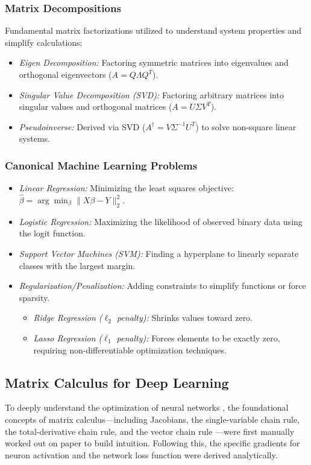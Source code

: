 \documentclass[conference]{IEEEtran}
\begin{document}
\subsubsection{Matrix Decompositions}
Fundamental matrix factorizations utilized to understand system properties and simplify calculations:
\begin{itemize}
    \item \textit{Eigen Decomposition:} Factoring symmetric matrices into eigenvalues and orthogonal eigenvectors ($A = Q\Lambda Q^T$).
    \item \textit{Singular Value Decomposition (SVD):} Factoring arbitrary matrices into singular values and orthogonal matrices ($A = U\Sigma V^T$).
    \item \textit{Pseudoinverse:} Derived via SVD ($A^\dagger = V\Sigma^{-1}U^T$) to solve non-square linear systems.
\end{itemize}

\subsubsection{Canonical Machine Learning Problems}
\begin{itemize}
    \item \textit{Linear Regression:} Minimizing the least squares objective: $\hat{\beta} = \arg\min_\beta \|X\beta - Y\|_2^2$.
    \item \textit{Logistic Regression:} Maximizing the likelihood of observed binary data using the logit function.
    \item \textit{Support Vector Machines (SVM):} Finding a hyperplane to linearly separate classes with the largest margin.
    \item \textit{Regularization/Penalization:} Adding constraints to simplify functions or force sparsity.
    \begin{itemize}
        \item[$\bullet$] \textit{Ridge Regression ($\ell_2$ penalty):} Shrinks values toward zero.
        \item[$\bullet$] \textit{Lasso Regression ($\ell_1$ penalty):} Forces elements to be exactly zero, requiring non-differentiable optimization techniques.
    \end{itemize}
\end{itemize}

\subsection{Matrix Calculus for Deep Learning}
To deeply understand the optimization of neural networks \cite{goodfellow2016deep}, the foundational concepts of matrix calculus—including Jacobians, the single-variable chain rule, the total-derivative chain rule, and the vector chain rule \cite{parr2018matrix}—were first manually worked out on paper to build intuition. Following this, the specific gradients for neuron activation and the network loss function were derived analytically.
\end{document}

